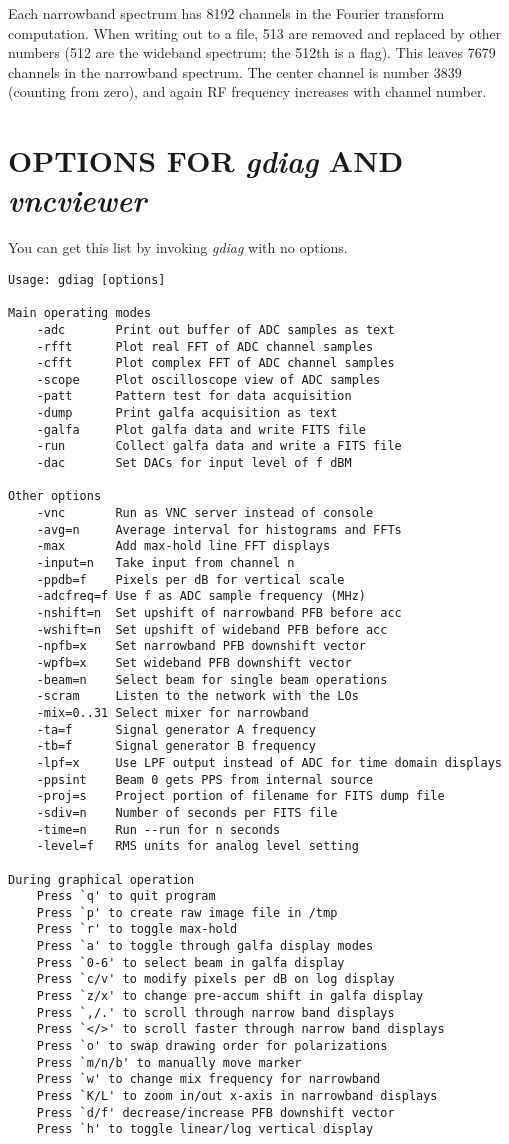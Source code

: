 \documentclass[psfig,preprint]{aastex}
\begin{document}
	Each narrowband spectrum has 8192 channels in the Fourier
transform computation.  When writing out to a file, 513 are removed
and replaced by other numbers (512 are the wideband
spectrum; the 512th is a flag). This leaves 7679 channels in the
narrowband spectrum. The center channel is number 3839 (counting from
zero), and again RF frequency increases with channel number.


\section{ OPTIONS FOR {\it gdiag} AND {\it vncviewer}} \label{doc}

	You can get this list by invoking {\it gdiag} with no options.

\begin{verbatim}
Usage: gdiag [options]

Main operating modes
    -adc       Print out buffer of ADC samples as text
    -rfft      Plot real FFT of ADC channel samples
    -cfft      Plot complex FFT of ADC channel samples
    -scope     Plot oscilloscope view of ADC samples
    -patt      Pattern test for data acquisition
    -dump      Print galfa acquisition as text
    -galfa     Plot galfa data and write FITS file
    -run       Collect galfa data and write a FITS file
    -dac       Set DACs for input level of f dBM

Other options
    -vnc       Run as VNC server instead of console
    -avg=n     Average interval for histograms and FFTs
    -max       Add max-hold line FFT displays
    -input=n   Take input from channel n
    -ppdb=f    Pixels per dB for vertical scale
    -adcfreq=f Use f as ADC sample frequency (MHz)
    -nshift=n  Set upshift of narrowband PFB before acc
    -wshift=n  Set upshift of wideband PFB before acc
    -npfb=x    Set narrowband PFB downshift vector
    -wpfb=x    Set wideband PFB downshift vector
    -beam=n    Select beam for single beam operations
    -scram	   Listen to the network with the LOs
    -mix=0..31 Select mixer for narrowband
    -ta=f      Signal generator A frequency
    -tb=f      Signal generator B frequency
    -lpf=x     Use LPF output instead of ADC for time domain displays
    -ppsint    Beam 0 gets PPS from internal source
    -proj=s    Project portion of filename for FITS dump file
    -sdiv=n    Number of seconds per FITS file
    -time=n    Run --run for n seconds
    -level=f   RMS units for analog level setting

During graphical operation
    Press `q' to quit program
    Press `p' to create raw image file in /tmp
    Press `r' to toggle max-hold
    Press `a' to toggle through galfa display modes
    Press `0-6' to select beam in galfa display
    Press `c/v' to modify pixels per dB on log display
    Press `z/x' to change pre-accum shift in galfa display
    Press `,/.' to scroll through narrow band displays
    Press `</>' to scroll faster through narrow band displays
    Press `o' to swap drawing order for polarizations
    Press `m/n/b' to manually move marker
    Press `w' to change mix frequency for narrowband
    Press `K/L' to zoom in/out x-axis in narrowband displays
    Press `d/f' decrease/increase PFB downshift vector
    Press `h' to toggle linear/log vertical display


\end{verbatim}
\end{document}
